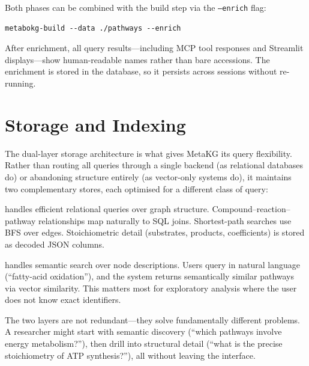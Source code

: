 \documentclass[10pt]{article}
\begin{document}
Both phases can be combined with the build step via the \texttt{--enrich}
flag:

\begin{lstlisting}[style=bash]
metabokg-build --data ./pathways --enrich
\end{lstlisting}

After enrichment, all query results---including MCP tool responses and
Streamlit displays---show human-readable names rather than bare accessions.
The enrichment is stored in the database, so it persists across sessions
without re-running.

\section{Storage and Indexing}
\label{sec:storage}

The dual-layer storage architecture is what gives MetaKG its query
flexibility. Rather than routing all queries through a single backend (as
relational databases do) or abandoning structure entirely (as vector-only
systems do), it maintains two complementary stores, each optimised for a
different class of query:

\begin{description}[leftmargin=*,itemsep=3pt]
\item[SQLite] handles efficient relational queries over graph structure.
  Compound--reaction--pathway relationships map naturally to SQL joins.
  Shortest-path searches use BFS over edges. Stoichiometric detail
  (substrates, products, coefficients) is stored as decoded JSON columns.

\item[LanceDB + embeddings] handles semantic search over node descriptions.
  Users query in natural language (``fatty-acid oxidation''), and the system
  returns semantically similar pathways via vector similarity. This matters
  most for exploratory analysis where the user does not know exact identifiers.
\end{description}

The two layers are not redundant---they solve fundamentally different
problems. A researcher might start with semantic discovery (``which pathways
involve energy metabolism?''), then drill into structural detail (``what is the
precise stoichiometry of ATP synthesis?''), all without leaving the interface.
\end{document}
